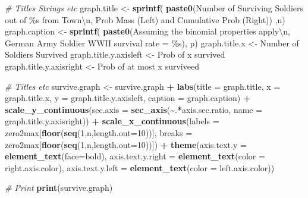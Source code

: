 \documentclass[
]{book}
\newenvironment{Shaded}{\begin{snugshade}}{\end{snugshade}}
\newcommand{\CharTok}[1]{\textcolor[rgb]{0.31,0.60,0.02}{#1}}
\newcommand{\CommentTok}[1]{\textcolor[rgb]{0.56,0.35,0.01}{\textit{#1}}}
\newcommand{\DataTypeTok}[1]{\textcolor[rgb]{0.13,0.29,0.53}{#1}}
\newcommand{\DecValTok}[1]{\textcolor[rgb]{0.00,0.00,0.81}{#1}}
\newcommand{\KeywordTok}[1]{\textcolor[rgb]{0.13,0.29,0.53}{\textbf{#1}}}
\newcommand{\NormalTok}[1]{#1}
\newcommand{\OperatorTok}[1]{\textcolor[rgb]{0.81,0.36,0.00}{\textbf{#1}}}
\newcommand{\StringTok}[1]{\textcolor[rgb]{0.31,0.60,0.02}{#1}}
\begin{document}
\begin{Shaded}
\begin{Highlighting}[]
\CommentTok{\# Titles Strings etc}
\NormalTok{graph.title \textless{}{-}}\StringTok{ }\KeywordTok{sprintf}\NormalTok{(}
    \KeywordTok{paste0}\NormalTok{(}\StringTok{\textquotesingle{}Number of Surviving Soldiers out of \%s from Town}\CharTok{\textbackslash{}n}\StringTok{\textquotesingle{}}\NormalTok{,}
           \StringTok{\textquotesingle{}Prob Mass (Left) and Cumulative Prob (Right)\textquotesingle{}}\NormalTok{) ,n)}
\NormalTok{graph.caption \textless{}{-}}\StringTok{ }\KeywordTok{sprintf}\NormalTok{(}
    \KeywordTok{paste0}\NormalTok{(}\StringTok{\textquotesingle{}Assuming the binomial properties apply}\CharTok{\textbackslash{}n}\StringTok{\textquotesingle{}}\NormalTok{,}
           \StringTok{\textquotesingle{}German Army Soldier WWII survival rate = \%s\textquotesingle{}}\NormalTok{), p)}
\NormalTok{graph.title.x \textless{}{-}}\StringTok{ \textquotesingle{}Number of Soldiers Survived\textquotesingle{}}
\NormalTok{graph.title.y.axisleft \textless{}{-}}\StringTok{ \textquotesingle{}Prob of x survived\textquotesingle{}}
\NormalTok{graph.title.y.axisright \textless{}{-}}\StringTok{ \textquotesingle{}Prob of at most x surviveed\textquotesingle{}}

\CommentTok{\# Titles etc}
\NormalTok{survive.graph \textless{}{-}}\StringTok{ }\NormalTok{survive.graph }\OperatorTok{+}
\StringTok{    }\KeywordTok{labs}\NormalTok{(}\DataTypeTok{title =}\NormalTok{ graph.title,}
         \DataTypeTok{x =}\NormalTok{ graph.title.x,}
         \DataTypeTok{y =}\NormalTok{ graph.title.y.axisleft,}
         \DataTypeTok{caption =}\NormalTok{ graph.caption) }\OperatorTok{+}
\StringTok{    }\KeywordTok{scale\_y\_continuous}\NormalTok{(}\DataTypeTok{sec.axis =}
                       \KeywordTok{sec\_axis}\NormalTok{(}\OperatorTok{\textasciitilde{}}\NormalTok{.}\OperatorTok{*}\NormalTok{axis.sec.ratio, }\DataTypeTok{name =}\NormalTok{ graph.title.y.axisright)) }\OperatorTok{+}
\StringTok{    }\KeywordTok{scale\_x\_continuous}\NormalTok{(}\DataTypeTok{labels =}\NormalTok{ zero2max[}\KeywordTok{floor}\NormalTok{(}\KeywordTok{seq}\NormalTok{(}\DecValTok{1}\NormalTok{,n,}\DataTypeTok{length.out=}\DecValTok{10}\NormalTok{))],}
                       \DataTypeTok{breaks =}\NormalTok{ zero2max[}\KeywordTok{floor}\NormalTok{(}\KeywordTok{seq}\NormalTok{(}\DecValTok{1}\NormalTok{,n,}\DataTypeTok{length.out=}\DecValTok{10}\NormalTok{))]) }\OperatorTok{+}
\StringTok{    }\KeywordTok{theme}\NormalTok{(}\DataTypeTok{axis.text.y =} \KeywordTok{element\_text}\NormalTok{(}\DataTypeTok{face=}\StringTok{\textquotesingle{}bold\textquotesingle{}}\NormalTok{),}
          \DataTypeTok{axis.text.y.right =} \KeywordTok{element\_text}\NormalTok{(}\DataTypeTok{color =}\NormalTok{ right.axis.color),}
          \DataTypeTok{axis.text.y.left =} \KeywordTok{element\_text}\NormalTok{(}\DataTypeTok{color =}\NormalTok{ left.axis.color))}

\CommentTok{\# Print}
\KeywordTok{print}\NormalTok{(survive.graph)}
\end{Highlighting}
\end{Shaded}
\end{document}
